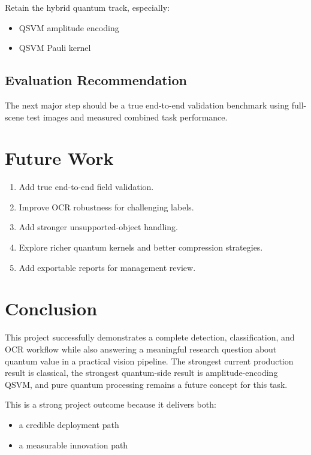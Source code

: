 \documentclass[12pt,a4paper]{article}
\begin{document}
Retain the hybrid quantum track, especially:
\begin{itemize}
  \item QSVM amplitude encoding
  \item QSVM Pauli kernel
\end{itemize}

\subsection{Evaluation Recommendation}

The next major step should be a true end-to-end validation benchmark using full-scene test images and measured combined task performance.

\section{Future Work}

\begin{enumerate}
  \item Add true end-to-end field validation.
  \item Improve OCR robustness for challenging labels.
  \item Add stronger unsupported-object handling.
  \item Explore richer quantum kernels and better compression strategies.
  \item Add exportable reports for management review.
\end{enumerate}

\section{Conclusion}

This project successfully demonstrates a complete detection, classification, and OCR workflow while also answering a meaningful research question about quantum value in a practical vision pipeline. The strongest current production result is classical, the strongest quantum-side result is amplitude-encoding QSVM, and pure quantum processing remains a future concept for this task.

This is a strong project outcome because it delivers both:
\begin{itemize}
  \item a credible deployment path
  \item a measurable innovation path
\end{itemize}
\end{document}
